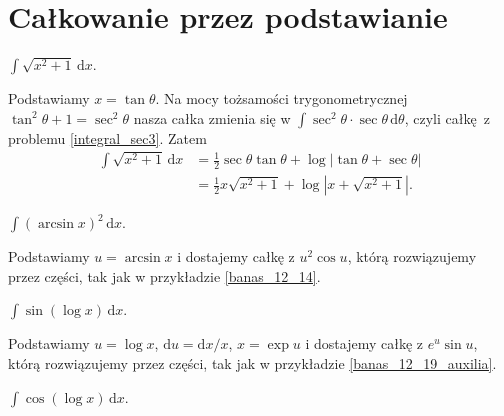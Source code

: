 \section{Całkowanie przez podstawianie}


\begin{integral}
    $\int \sqrt{x^2 + 1} \, \mathrm{d}x$.
\end{integral}

\begin{solution}
    Podstawiamy $x = \tan \theta$.
    Na mocy tożsamości trygonometrycznej $\tan^2 \theta + 1 = \sec^2 \theta$ nasza całka zmienia się w $\int \sec^2 \theta \cdot \sec \theta \,\mathrm{d}\theta$, czyli całkę z problemu \ref{integral_sec3}.
    Zatem
    \begin{align}
        \int \sqrt{x^2 + 1} \, \mathrm{d}x & = \frac 12 \sec \theta \tan \theta + \log |\tan \theta + \sec \theta| \\
        & = \frac 1 2 x \sqrt{x^2 + 1} + \log \left|x + \sqrt{x^2+1}\right|.
    \end{align}
\end{solution}


\begin{integral}
    $\int (\arcsin x)^2 \,\mathrm{d}x$.
\end{integral}

\begin{solution}
    Podstawiamy $u = \arcsin x$ i dostajemy całkę z $u^2 \cos u$, którą rozwiązujemy przez części, tak jak w przykładzie \ref{banas_12_14}.
\end{solution}

\begin{integral}
    $\int \sin(\log x) \, \mathrm{d}x$.
\end{integral}

\begin{solution}
    Podstawiamy $u = \log x$, $\mathrm{d} u = \mathrm{d} x / x$, $x = \exp u$ i dostajemy całkę z $e^u \sin u$, którą rozwiązujemy przez części, tak jak w przykładzie \ref{banas_12_19_auxilia}.
\end{solution}

\begin{integral}
    $\int \cos(\log x) \, \mathrm{d}x$.
\end{integral}    

